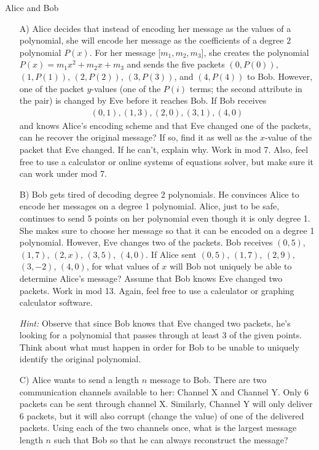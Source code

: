 \begin{homeworkProblem}{Alice and Bob}

    \begin{itemize}
        \item[A)] Alice decides that instead of encoding her message as the 
        values of a polynomial, she will encode her message as the coefficients 
        of a degree $2$ polynomial $P(x)$. For her message [$m_1, m_2, m_3$], 
        she creates the polynomial $P(x) = m_1x^2 + m_2x + m_3$ and sends the 
        five packets $(0, P(0))$, $(1, P(1))$, $(2, P(2))$, $(3, P(3))$, and 
        $(4, P(4))$ to Bob. However, one of the packet $y$-values (one of the 
        $P(i)$ terms; the second attribute in the pair) is changed by Eve before 
        it reaches Bob. If Bob receives
        \begin{align*}
            (0, 1), (1, 3), (2, 0), (3, 1), (4, 0)
        \end{align*}
        and knows Alice's encoding scheme and that Eve changed one of the 
        packets, can he recover the original message? If so, find it as well as 
        the $x$-value of the packet that Eve changed. If he can't, explain why. 
        Work in mod 7. Also, feel free to use a calculator or online systems of 
        equations solver, but make sure it can work under mod 7.
   
        \item[B)] Bob gets tired of decoding degree 2 polynomials. He convinces 
        Alice to encode her messages on a degree 1 polynomial. Alice, just to be 
        safe, continues to send 5 points on her polynomial even though it is 
        only degree 1. She makes sure to choose her message so that it can be 
        encoded on a degree 1 polynomial. However, Eve changes two of the 
        packets. Bob receives $(0, 5)$, $(1, 7)$, $(2, x)$, $(3, 5)$, $(4, 0)$. 
        If Alice sent $(0, 5)$, $(1, 7)$, $(2, 9)$, $(3, -2)$, $(4, 0)$, for 
        what values of $x$ will Bob not uniquely be able to determine Alice's 
        message? Assume that Bob knows Eve changed two packets. Work in mod 13. 
        Again, feel free to use a calculator or graphing calculator software.

        \textit{Hint:} Observe that since Bob knows that Eve changed two 
        packets, he's looking for a polynomial that passes through at least 3 of 
        the given points. Think about what must happen in order for Bob to be 
        unable to uniquely identify the original polynomial.

        \item[C)] Alice wants to send a length $n$ message to Bob. There are two 
        communication channels available to her: Channel X and Channel Y. Only 6 
        packets can be sent through channel X. Similarly, Channel Y will only 
        deliver 6 packets, but it will also corrupt (change the value) of one of 
        the delivered packets. Using each of the two channels once, what is the 
        largest message length $n$ such that Bob so that he can always 
        reconstruct the message? 

    \end{itemize}

\end{homeworkProblem}
